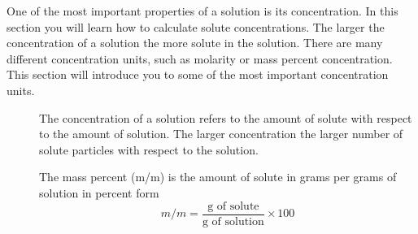 \documentclass[main.tex]{subfiles}
\begin{document}
                            
One of the most important properties of a solution is its concentration. In this section you will learn how to calculate solute concentrations. The larger the concentration of a solution the more solute in the solution. There are many different concentration units, such as molarity or mass percent concentration. This section will introduce you to some of the most important concentration units.
\sloppy 
\begin{description}
\item[] The concentration of a solution refers to the amount of solute with respect to the amount of solution. The larger concentration the larger number of solute particles with respect to the solution. 
\item[] The mass percent (m/m) is the amount of solute in grams per grams of solution in percent form
\begin{equation*}
\boxed{ m/m=\frac{\text{g of solute}}{\text{g of solution}}\times 100}   
\end{equation*}








\end{description}
\end{document}
